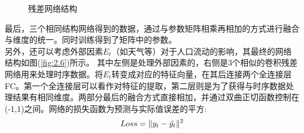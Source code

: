 \begin{figure}[ht]
\centering
{}
\hfill
\caption{残差网络结构}
\end{figure}
最后，三个相同结构网络得到的数据，通过与参数矩阵相乘再相加的方式进行融合与维度的统一。同时训练得到了矩阵中的参数。
\\
\indent 另外，还可以考虑外部因素$E_t$（如天气等）对于人口流动的影响，其最终的网络结构如图(\ref{fig:2.6})所示。
其中左侧是处理外部因素的，右侧是3个相似的卷积残差网络用来处理时序数据。将$E_t$转变成对应的特征向量，在其后连接两个全连接层FC。第一个全连接层可以看作对特征的提取，第二层则是为了获得与时序数据处理结果有相同维度。两部分最后的融合方式直接相加，并通过双曲正切函数控制在(-1,1)之间。网络的损失函数为预测与实际值误差的平方:
\begin{equation}
Loss = \Arrowvert y_t - \hat{y_t} \Arrowvert^2
\end{equation}
